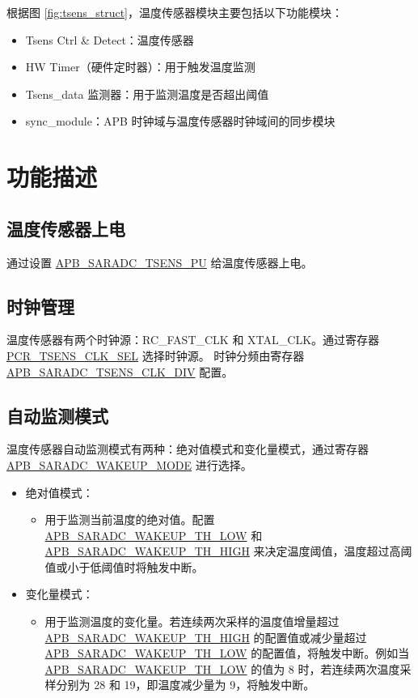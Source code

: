 \documentclass[main\_\_CN.tex]{subfiles}
\begin{document}
根据图 \ref{fig:tsens_struct}，温度传感器模块主要包括以下功能模块：

\begin{itemize}
\item Tsens Ctrl \& Detect：温度传感器
    \item HW Timer（硬件定时器）：用于触发温度监测
    \item Tsens\_data 监测器：用于监测温度是否超出阈值
    \item sync\_module：APB 时钟域与温度传感器时钟域间的同步模块
\end{itemize}
\section{功能描述}

\subsection{温度传感器上电}
通过设置 \hyperref[fielddesc:APBSARADCTSENSPU]{APB\_SARADC\_TSENS\_PU} 给温度传感器上电。

\subsection{时钟管理}
温度传感器有两个时钟源：RC\_FAST\_CLK 和 XTAL\_CLK。通过寄存器 \hyperref[fielddesc:PCRTSENSCLKSEL]{PCR\_TSENS\_CLK\_SEL} 选择时钟源。
时钟分频由寄存器 \hyperref[fielddesc:APBSARADCTSENSCLKDIV]{APB\_SARADC\_TSENS\_CLK\_DIV} 配置。

\subsection{自动监测模式}
温度传感器自动监测模式有两种：绝对值模式和变化量模式，通过寄存器 \hyperref[fielddesc:APBSARADCWAKEUPMODE]{APB\_SARADC\_WAKEUP\_MODE} 进行选择。

   \begin{itemize}
       \item 绝对值模式：
           \begin{itemize}
                \item 用于监测当前温度的绝对值。配置 \hyperref[fielddesc:APBSARADCWAKEUPTHLOW]{APB\_SARADC\_WAKEUP\_TH\_LOW} 和 \hyperref[fielddesc:APBSARADCWAKEUPTHHIGH]{APB\_SARADC\_WAKEUP\_TH\_HIGH} 来决定温度阈值，温度超过高阈值或小于低阈值时将触发中断。
           \end{itemize}
       \item 变化量模式：
            \begin{itemize}
                \item 用于监测温度的变化量。若连续两次采样的温度值增量超过 \hyperref[fielddesc:APBSARADCWAKEUPTHHIGH]{APB\_SARADC\_WAKEUP\_TH\_HIGH} 的配置值或减少量超过 \hyperref[fielddesc:APBSARADCWAKEUPTHLOW]{APB\_SARADC\_WAKEUP\_TH\_LOW} 的配置值，将触发中断。例如当 \hyperref[fielddesc:APBSARADCWAKEUPTHLOW]{APB\_SARADC\_WAKEUP\_TH\_LOW} 的值为 8 时，若连续两次温度采样分别为 28 和 19，即温度减少量为 9，将触发中断。
            \end{itemize}
    \end{itemize}
\end{document}
